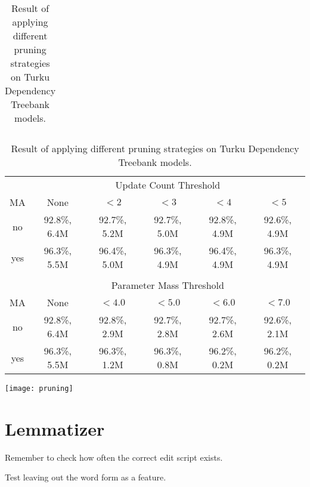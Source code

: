 \begin{table}[htb!]
\begin{center}
\begin{tabular}{c|ccccc}

\end{tabular}
\caption{Result of applying different pruning strategies on Turku Dependency Treebank models.}
\end{center}
\end{table}

\begin{table}[htb!]
\begin{center}
\begin{tabular}{c|ccccc}
\multicolumn{1}{c}{}                       & \multicolumn{5}{c}{Update Count Threshold}\\
MA                     & None            & $< 2$        & $< 3$        & $< 4$        & $< 5$       \\
\hline
no                     & 92.8\%, 6.4M    & 92.7\%, 5.2M & 92.7\%, 5.0M & 92.8\%, 4.9M & 92.6\%, 4.9M \\
yes                    & 96.3\%, 5.5M    & 96.4\%, 5.0M & 96.3\%, 4.9M & 96.4\%, 4.9M & 96.3\%, 4.9M \\
                       &                 &              &              &              &              \\
\multicolumn{1}{c}{}     & \multicolumn{5}{c}{Parameter Mass Threshold}\\
MA                     & None           & $< 4.0$        & $< 5.0$      & $< 6.0$      & $< 7.0$     \\
\hline
no                     & 92.8\%, 6.4M   & 92.8\%, 2.9M   & 92.7\%, 2.8M & 92.7\%, 2.6M & 92.6\%, 2.1M \\
yes                    & 96.3\%, 5.5M   & 96.3\%, 1.2M   & 96.3\%, 0.8M & 96.2\%, 0.2M & 96.2\%, 0.2M \\
\end{tabular}
\caption{Result of applying different pruning strategies on Turku Dependency Treebank models.}
\end{center}
\end{table}

\begin{table}[htb!]
\begin{center}
\texttt{[image: pruning]}
\end{center}
\end{table}

\section{Lemmatizer}

Remember to check how often the correct edit script exists.

Test leaving out the word form as a feature.